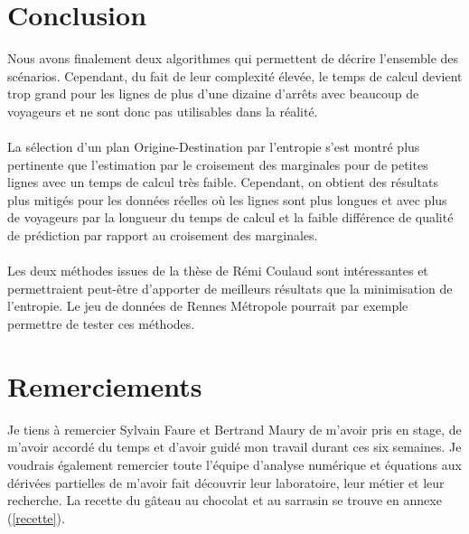 \documentclass[12pt]{article}
\begin{document}
\section{Conclusion}
Nous avons finalement deux algorithmes qui permettent de décrire l'ensemble des scénarios. Cependant, du fait de leur complexité élevée, le temps de calcul devient trop grand pour les lignes de plus d'une dizaine d'arrêts avec beaucoup de voyageurs et ne sont donc pas utilisables dans la réalité.\\
\\
La sélection d'un plan Origine-Destination par l'entropie s'est montré plus pertinente que l'estimation par le croisement des marginales pour de petites lignes avec un temps de calcul très faible. Cependant, on obtient des résultats plus mitigés pour les données réelles où les lignes sont plus longues et avec plus de voyageurs par la longueur du temps de calcul et la faible différence de qualité de prédiction par rapport au croisement des marginales.\\
\\
Les deux méthodes issues de la thèse de Rémi Coulaud sont intéressantes et permettraient peut-être d'apporter de meilleurs résultats que la minimisation de l'entropie. Le jeu de données de Rennes Métropole pourrait par exemple permettre de tester ces méthodes.
\section{Remerciements}
Je tiens à remercier Sylvain Faure et Bertrand Maury de m’avoir pris en stage, de m’avoir accordé du temps et d’avoir guidé mon travail durant ces six semaines. Je voudrais également remercier toute l'équipe d'analyse numérique et équations aux dérivées partielles de m'avoir fait découvrir leur laboratoire, leur métier et leur recherche. La recette du gâteau au chocolat et au sarrasin se trouve en annexe (\ref{recette}).
\newpage
{}

\newpage
\end{document}
